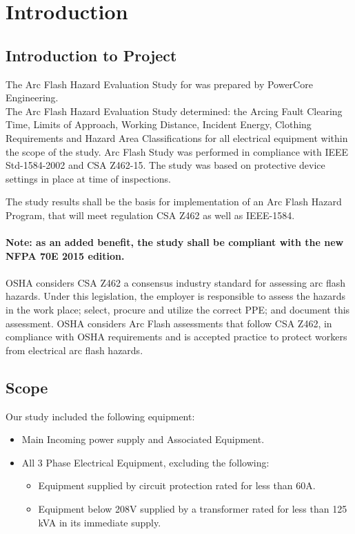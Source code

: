 
\section{Introduction}
\label{af:intro}

\subsection{Introduction to Project}
\label{af:intro:proj}

The Arc Flash Hazard Evaluation Study for \Customer{} was prepared by PowerCore Engineering.\\

The Arc Flash Hazard Evaluation Study determined: the Arcing Fault Clearing Time, Limits of Approach, Working Distance, Incident Energy, Clothing Requirements and Hazard Area Classifications for all electrical equipment within the scope of the study.  Arc Flash Study was performed in compliance with IEEE Std-1584-2002 and CSA Z462-15. The study was based on protective device settings in place at time of inspections.

The study results shall be the basis for implementation of an Arc Flash Hazard Program, that will meet regulation CSA Z462 as well as IEEE-1584.\\
\\
\textbf{Note: as an added benefit, the study shall be compliant with the new NFPA 70E 2015 edition.}\\
\\
OSHA considers CSA Z462 a consensus industry standard for assessing arc flash hazards. Under this legislation, the employer is responsible to assess the hazards in the work place; select, procure and utilize the correct PPE; and document this assessment. OSHA considers Arc Flash assessments that follow CSA Z462, in compliance with OSHA requirements and is accepted practice to protect workers from electrical arc flash hazards.\\


\subsection{Scope}
\label{af:intro:scope}

Our study included the following equipment:
\begin{itemize}
	\item Main Incoming power supply and Associated Equipment.
	\item All 3 Phase Electrical Equipment, excluding the following:
	\begin{itemize}
		\item Equipment supplied by circuit protection rated for less than 60A. 
		\item Equipment below 208V supplied by a transformer rated for less than 125 kVA in its immediate supply.
	\end{itemize}
\end{itemize}
